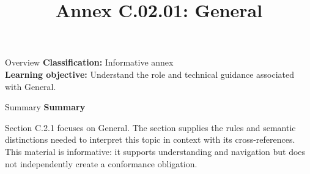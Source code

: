 \documentclass[10pt,letterpaper]{article}
\title{Annex C.02.01: General}
\author{}
\date{}
\begin{document}
\maketitle
\begin{CornellOverviewBox}{Overview}
\textbf{Classification:} Informative annex\\[2pt]
\textbf{Learning objective:} Understand the role and technical guidance associated with General.
\end{CornellOverviewBox}\begin{CornellSummaryBox}{Summary}
{\sffamily\bfseries\color{Accent} Summary}\par\vspace{3pt}Section C.2.1 focuses on General. The section supplies the rules and semantic distinctions needed to interpret this topic in context with its cross-references. This material is informative: it supports understanding and navigation but does not independently create a conformance obligation.
\end{CornellSummaryBox}
\end{document}
